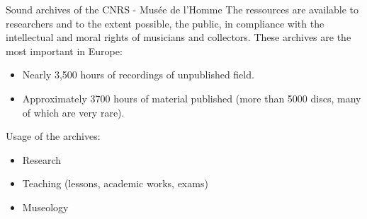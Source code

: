 \documentclass[final, hyperref, table]{beamer}
\begin{document}
\begin{frame}[containsverbatim]{}
\begin{columns}[T]
\begin{column}[T]{.49\linewidth}
      \begin{block}{Sound archives of the CNRS - Musée de l'Homme}
        The ressources are available to researchers and to the extent possible, the public, in compliance with the intellectual and moral rights of musicians and collectors.
            These archives are the most important in Europe:
            \begin{itemize}
            \item Nearly 3,500 hours of recordings of unpublished field.
            \item Approximately 3700 hours of material published (more than
              5000 discs, many of which are very rare).
            \end{itemize}
            Usage of the archives:
            \begin{itemize}
            \item Research
            \item Teaching (lessons, academic works, exams)
            \item Museology
            \end{itemize}
            \begin{center}
            \end{center}


      \end{block}
      

\end{column}
\end{columns}
\end{frame}
\end{document}
